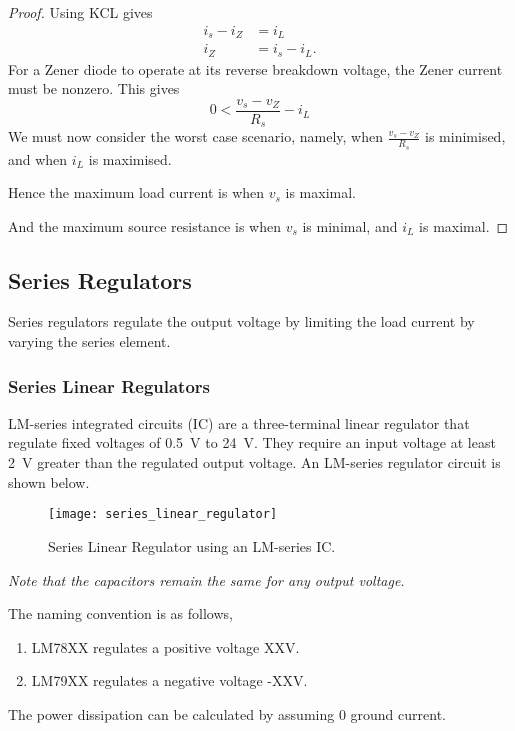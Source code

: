\documentclass{article}
\begin{document}
\begin{proof}
    Using KCL gives
    \begin{align*}
        i_s - i_Z & = i_L       \\
        i_Z       & = i_s - i_L.
    \end{align*}
    For a Zener diode to operate at its reverse breakdown voltage, the Zener current 
    must be nonzero. This gives
    \begin{equation*}
        0 < \frac{v_s - v_Z}{R_s} - i_L
    \end{equation*}
    We must now consider the worst case scenario, namely, when
    $\displaystyle \frac{v_s - v_Z}{R_s}$ is minimised, and when $i_L$ is maximised. 
    
    Hence the maximum load current is when $v_s$ is maximal. 

    And the maximum source resistance is when $v_s$ is minimal, and $i_L$ is maximal.
\end{proof}
\subsection{Series Regulators}
\begin{definition}
    Series regulators regulate the output voltage by limiting the load current by varying the series element.
\end{definition}
\subsubsection{Series Linear Regulators}
LM-series integrated circuits (IC) are a three-terminal linear regulator that regulate fixed voltages of \SI{0.5}{\volt} to \SI{24}{\volt}.
They require an input voltage at least \SI{2}{\volt} greater than the regulated output voltage. 
An LM-series regulator circuit is shown below.
\begin{figure}[H]
    \centering
    \texttt{[image: series\_linear\_regulator]}
    \caption{Series Linear Regulator using an LM-series IC.}
\end{figure}
\emph{Note that the capacitors remain the same for any output voltage.}

The naming convention is as follows,
\begin{enumerate}
    \item LM78XX regulates a positive voltage XX\si{\volt}.
    \item LM79XX regulates a negative voltage -XX\si{\volt}.
\end{enumerate}
The power dissipation can be calculated by assuming 0 ground current.
\end{document}
